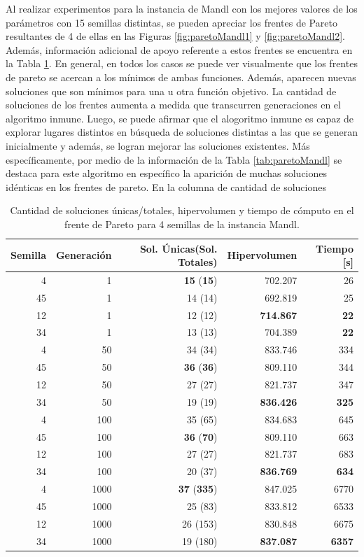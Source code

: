 Al realizar experimentos para la instancia de Mandl con los mejores valores de los parámetros con 15 semillas distintas, se pueden apreciar los frentes de Pareto resultantes de 4 de ellas en las Figuras \ref{fig:paretoMandl1} y \ref{fig:paretoMandl2}. Además, información adicional de apoyo referente a estos frentes se encuentra en la Tabla \ref{tab:dataFrenteMandl}. En general, en todos los casos se puede ver visualmente que los frentes de pareto se acercan a los mínimos de ambas funciones. Además, aparecen nuevas soluciones que son mínimos para una u otra función objetivo. La cantidad de soluciones de los frentes aumenta a medida que transcurren generaciones en el algoritmo inmune. Luego, se puede afirmar que el alogoritmo inmune es capaz de explorar lugares distintos en búsqueda de soluciones distintas a las que se generan inicialmente y además, se logran mejorar las soluciones existentes. Más específicamente, por medio de la información de la Tabla \ref{tab:paretoMandl} se destaca para este algoritmo en específico la aparición de muchas soluciones idénticas en los frentes de pareto. En la columna de cantidad de soluciones

\begin{table}[!htb]
\centering
\begin{tabular}{|r|r|r|r|r|}
\hline
Semilla & Generación & Sol. Únicas(Sol. Totales) & Hipervolumen & Tiempo [s]\\ 
\hline \hline
4 & 1 & \textbf{15} (\textbf{15}) & 702.207 & 26 \\ \hline
45 & 1 & 14 (14) & 692.819 & 25 \\ \hline
12 & 1 & 12 (12) & \textbf{714.867} & \textbf{22} \\ \hline
34 & 1 & 13 (13) & 704.389 & \textbf{22} \\ \hline \hline
4 & 50 & 34 (34) & 833.746 & 334 \\ \hline
45 & 50 & \textbf{36} (\textbf{36}) & 809.110 & 344 \\ \hline
12 & 50 & 27 (27) & 821.737 & 347 \\ \hline
34 & 50 & 19 (19) & \textbf{836.426} & \textbf{325} \\ \hline\hline
4 & 100 & 35 (65) & 834.683 & 645 \\ \hline
45 & 100 & \textbf{36} (\textbf{70}) & 809.110 & 663 \\ \hline
12 & 100 & 27 (27) & 821.737 & 683 \\ \hline
34 & 100 & 20 (37) & \textbf{836.769} & \textbf{634} \\ \hline \hline
4 & 1000 & \textbf{37} (\textbf{335}) & 847.025 & 6770 \\ \hline
45 & 1000 & 25 (83) & 833.812 & 6533 \\ \hline
12 & 1000 & 26 (153) & 830.848 & 6675 \\ \hline
34 & 1000 & 19 (180) & \textbf{837.087} & \textbf{6357} \\ \hline
\end{tabular}
\caption{Cantidad de soluciones únicas/totales, hipervolumen y tiempo de cómputo en el frente de Pareto para 4 semillas de la instancia Mandl.}
\label{tab:dataFrenteMandl}
\end{table}

